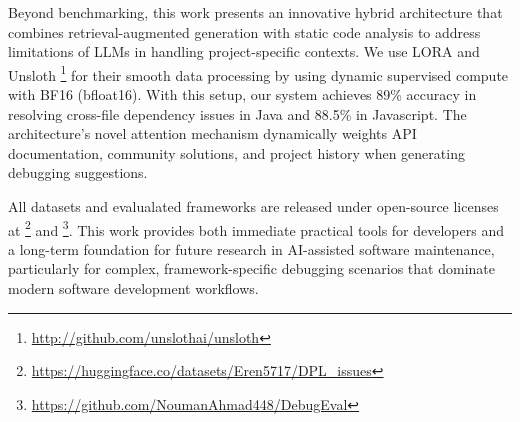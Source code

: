 Beyond benchmarking, this work presents an innovative hybrid architecture that combines retrieval-augmented generation with static code analysis to address limitations of LLMs in handling project-specific contexts. We use LORA and Unsloth \footnote{\url{http://github.com/unslothai/unsloth}} for their smooth data processing by using dynamic supervised compute with BF16 (bfloat16). With this setup, our system achieves 89\% accuracy in resolving cross-file dependency issues in Java and 88.5\% in Javascript. The architecture's novel attention mechanism dynamically weights API documentation, community solutions, and project history when generating debugging suggestions.

All datasets and evalualated frameworks are released under open-source licenses at \footnote{\url{https://huggingface.co/datasets/Eren5717/DPL_issues}} and \footnote{\url{https://github.com/NoumanAhmad448/DebugEval}}. This work provides both immediate practical tools for developers and a long-term foundation for future research in AI-assisted software maintenance, particularly for complex, framework-specific debugging scenarios that dominate modern software development workflows.



